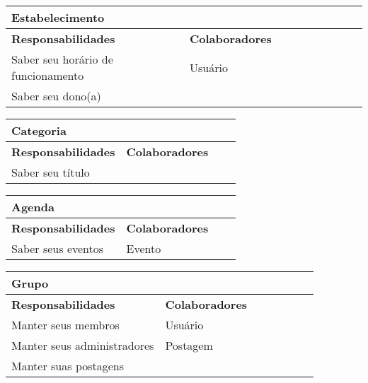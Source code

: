 \documentclass{article}
\begin{document}

    \begin{center}
   	 \begin{tabular}{|p{0.5\linewidth}|p{0.5\linewidth}|}
\hline
 	\multicolumn{2}{|p{\textwidth}|}{
{\large \textbf{Estabelecimento}}
}  \\
\hline
\textbf{Responsabilidades} & \textbf{Colaboradores} \\ 
\hline
  	Saber seu horário de funcionamento & Usuário \\
  	\hline
  	Saber seu dono(a) &  \\
  	\hline
   	\end{tabular} 
    \end{center}


    \begin{center}
   	 \begin{tabular}{|p{0.5\linewidth}|p{0.5\linewidth}|}
\hline
 	\multicolumn{2}{|p{\textwidth}|}{
{\large \textbf{Categoria}}
}  \\
\hline
\textbf{Responsabilidades} & \textbf{Colaboradores} \\ 
\hline
  	Saber seu título &  \\
  	\hline
   	\end{tabular} 
    \end{center}


    \begin{center}
   	 \begin{tabular}{|p{0.5\linewidth}|p{0.5\linewidth}|}
\hline
 	\multicolumn{2}{|p{\textwidth}|}{
{\large \textbf{Agenda}}
}  \\
\hline
\textbf{Responsabilidades} & \textbf{Colaboradores} \\ 
\hline
  	Saber seus eventos & Evento \\
  	\hline
   	\end{tabular} 
    \end{center}


    \begin{center}
   	 \begin{tabular}{|p{0.5\linewidth}|p{0.5\linewidth}|}
\hline
 	\multicolumn{2}{|p{\textwidth}|}{
{\large \textbf{Grupo}}
}  \\
\hline
\textbf{Responsabilidades} & \textbf{Colaboradores} \\ 
\hline
  	Manter seus membros & Usuário \\
  	\hline
  	Manter seus administradores & Postagem \\
  	\hline
  	Manter suas postagens & \\
  	\hline
   	\end{tabular} 
    \end{center}
\end{document}
